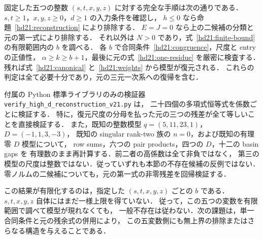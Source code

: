 固定した五つの整数 $(s,t,x,y,z)$ に対する完全な手順は次の通りである．
$s,t\ge1$，$x,y,z\ge0$，$d\ge1$ の入力条件を確認し，
$h\le0$ なら命題~\ref{hd21:reconstruction} により排除する．
$E=J=0$ なら上の二候補の分類と元の第一式により排除する．
それ以外は $N>0$ であり，式~\eqref{hd21:finite-bound} の有限範囲内の $b$ を調べる．
各 $b$ で合同条件~\eqref{hd21:congruence}，尺度と entry の正値性，
$\alpha\ge k\ge b+1$，最後に元の式~\eqref{hd21:one-residue} を厳密に検査する．
残れば式~\eqref{hd21:canonical} と~\eqref{hd21:weights} から模型が復元される．
これらの判定は全て必要十分であり，元の三元一次系への復帰を含む．

付属の Python 標準ライブラリのみの検証器
\texttt{verify\_high\_d\_reconstruction\_v21.py} は，
二十四個の多項式恒等式を係数ごとに検証する．
特に，復元尺度の分母を払った元の三つの残差が全て等しいことを直接検証する．
また，既知の整数模型
$q=(5,11,23,1)$，$D=(-1,1,3,-3)$，
既知の singular rank-two 族の $n=0$，および既知の有理零 $D$ 模型について，
row sums，六つの pair products，四つの $D$，十二の basin gaps を
有理数のまま再計算する．前二者の高係数は全て非負ではなく，
第三の模型の尺度は整数ではない．従っていずれも本節の不存在候補の反例ではない．
零ノルムの二候補についても，元の第一式の非零残差を回帰検証する．

この結果が有限化するのは，指定した $(s,t,x,y,z)$ ごとの $b$ である．
$s,t,x,y,z$ 自体にはまだ一様上限を得ていない．
従って，この五つの変数を有限範囲で調べて模型が現れなくても，
一般不存在は従わない．次の課題は，単一合同条件と元の残余式の併用により，
この五変数側にも無上界の排除またはさらなる構造を与えることである．
